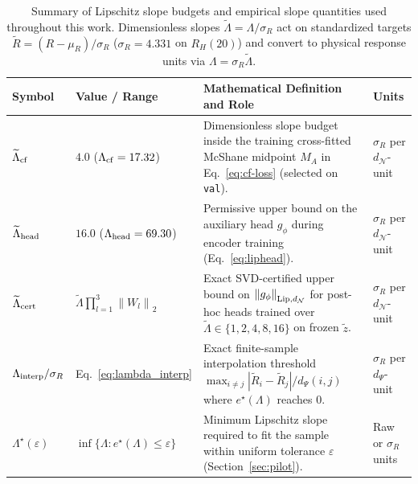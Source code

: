 \documentclass[preprint,11pt,a4paper]{elsarticle}
\newcommand{\norm}[1]{\left\lVert #1\right\rVert}
\begin{document}
\begin{table}[ht!]
\centering
\caption{Summary of Lipschitz slope budgets and empirical slope quantities used throughout this work. Dimensionless slopes $\widetilde\Lambda=\Lambda/\sigma_R$ act on standardized targets $\tilde R=(R-\mu_R)/\sigma_R$ ($\sigma_R=4.331$ on $R_H(20)$) and convert to physical response units via $\Lambda=\sigma_R\widetilde\Lambda$.}
\label{tab:lambda_defs}
\footnotesize
\setlength{\tabcolsep}{4.2pt}
\begin{tabular}{llp{}l}
\toprule
Symbol & Value / Range & Mathematical Definition and Role & Units \\
\midrule
$\widetilde\Lambda_{\rm cf}$ & $4.0$ ($\Lambda_{\rm cf}=17.32$) & Dimensionless slope budget inside the training cross-fitted McShane midpoint $M_A$ in Eq.~\eqref{eq:cf-loss} (selected on \texttt{val}). & $\sigma_R$ per $d_{\mathcal N}$-unit \\
$\widetilde\Lambda_{\rm head}$ & $16.0$ ($\Lambda_{\rm head}=69.30$) & Permissive upper bound on the auxiliary head $g_\phi$ during encoder training (Eq.~\eqref{eq:liphead}). & $\sigma_R$ per $d_{\mathcal N}$-unit \\
$\widetilde\Lambda_{\rm cert}$ & $\widetilde\Lambda\prod_{l=1}^3\norm{W_l}_2$ & Exact SVD-certified upper bound on $\norm{g_\phi}_{{\rm Lip},d_{\mathcal N}}$ for post-hoc heads trained over $\widetilde\Lambda\in\{1,2,4,8,16\}$ on frozen $\tilde z$. & $\sigma_R$ per $d_{\mathcal N}$-unit \\
$\Lambda_{\rm interp}/\sigma_R$ & Eq.~\eqref{eq:lambda_interp} & Exact finite-sample interpolation threshold $\max_{i\ne j}|\tilde R_i-\tilde R_j|/d_\Psi(i,j)$ where $e^\star(\Lambda)$ reaches $0$. & $\sigma_R$ per $d_\Psi$-unit \\
$\Lambda^\star(\varepsilon)$ & $\inf\{\Lambda:e^\star(\Lambda)\le\varepsilon\}$ & Minimum Lipschitz slope required to fit the sample within uniform tolerance $\varepsilon$ (Section~\ref{sec:pilot}). & Raw or $\sigma_R$ units \\
\bottomrule
\end{tabular}
\end{table}
\end{document}
